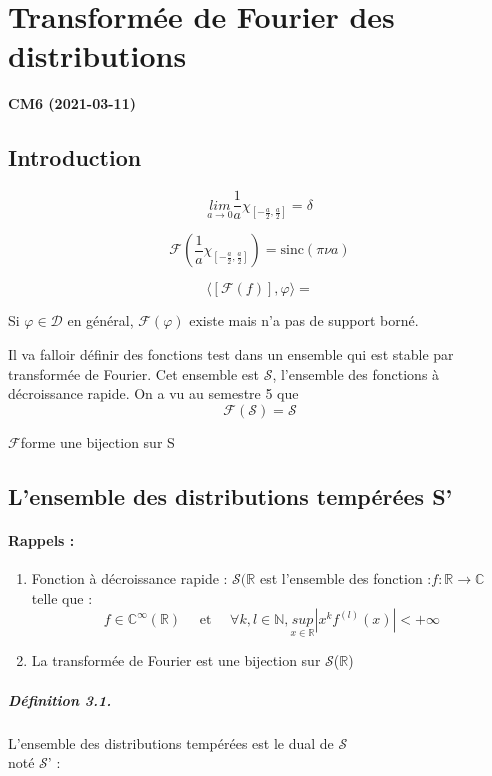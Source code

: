 \documentclass[12pt,a4paper]{report}
\newcommand{\ens}[1]{\ensuremath{\mathbb{#1}}}
\newcommand{\D}{\ensuremath{\mathcal{D}}}
\newcommand{\F}{\ensuremath{\mathcal{F}}}
\newcommand{\Sf}{\ensuremath{\mathcal{S}}}
\begin{document}
\chapter{Transformée de Fourier des distributions}

\begin{center}
\textbf{CM6 (2021-03-11)}
\end{center}

\section{Introduction}

\[
	\underset{a\rightarrow 0}{lim} \frac{1}{a}\chi_{[-\frac{a}{2}, \frac{a}{2}]} = \delta
\]

\[
	\F( \frac{1}{a}\chi_{[-\frac{a}{2}, \frac{a}{2}]}) = \text{sinc} (\pi \nu a)
\]

\[
	\langle [\F(f)], \varphi \rangle = 
\]

Si \(\varphi \in \D\) en général, \(\F(\varphi)\) existe mais n'a pas de support borné.

Il va falloir définir des fonctions test dans un ensemble qui est stable par transformée de Fourier.
Cet ensemble est \Sf, l'ensemble des fonctions à décroissance rapide. On a vu au semestre 5 que 
\[
	\F(\Sf) = \Sf
\]

\F forme une bijection sur S

\section{L'ensemble des distributions tempérées S'}

\subsubsection{Rappels :}

\begin{enumerate}
	\item Fonction à décroissance rapide : \(\Sf(\ens{R}\) est l'ensemble des fonction :\(f : \ens{R} \rightarrow \ens{C} \) telle que :
	\[
		f \in \ens{C}^\infty(\ens{R}) \quad \text{ et } \quad \forall k, l \in \ens{N}, \underset{x \in \ens{R}}{sup} | x^k f^{(l)}(x) | < +\infty
	\]
	\item La transformée de Fourier est une bijection sur \Sf(\ens{R})
\end{enumerate}

\paragraph{Définition 3.1.} L'ensemble des distributions tempérées est le dual de \Sf\\ noté \Sf' :
\end{document}
